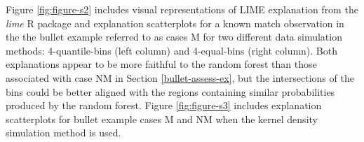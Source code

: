 \documentclass{article}\usepackage[]{graphicx}\usepackage[]{color}
\begin{document}
Figure \ref{fig:figure-s2} includes visual representations of LIME explanation from the \emph{lime} R package and explanation scatterplots for a known match observation in the the bullet example referred to as cases M for two different data simulation methods: 4-quantile-bins (left column) and 4-equal-bins (right column). Both explanations appear to be more faithful to the random forest than those associated with case NM in Section \ref{bullet-assess-ex}, but the intersections of the bins could be better aligned with the regions containing similar probabilities produced by the random forest. Figure \ref{fig:figure-s3} includes explanation scatterplots for bullet example cases M and NM when the kernel density simulation method is used.

\begin{figure*}[!t]

\caption{Plots of LIME explanations (first row) and explanation scatterplots (second row) for case M in the bullet test data for two tuning parameter values: 4-quantile-bins (first column) and 4-equal-bins (second column).}
\label{fig:figure-s2}
\end{figure*}

\begin{figure*}[!thp]

\caption{Explanation scatterplots for LIME explanations using kernel density simulation for the cases M and NM of the bullet comparison test data.}
\label{fig:figure-s3}
\end{figure*}
\end{document}
